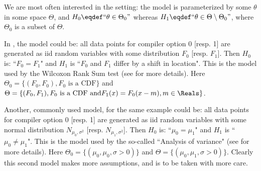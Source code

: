 We are most often interested in the  setting:
the model is parameterized by some $\theta$ in some space
$\Theta$, and  $H_0 \eqdef ``\theta \in \Theta_0 "$ whereas
$H_1 \eqdef ``\theta \in \Theta \setminus \Theta_0 "$, where
$\Theta_0$ is a subset of $\Theta$.

In , the model could be: all data points for
compiler option 0 [resp. 1] are generated as iid random
variables with some distribution $F_0$ [resp. $F_1$]. Then
$H_0$ is: ``$F_0=F_1$" and $H_1$ is ``$F_0$ and $F_1$ differ by
a shift in location". This is the model used by the Wilcoxon
Rank Sum test (see  for more details). Here
 $\Theta_0=\{(F_0, F_0), F_0 \mbox{ is a CDF}\}$ and
$\Theta=\{(F_0, F_1), F_0 \mbox{ is a CDF and} F_1(x)=F_0(x-m),
m\in \Reals\}$.

Another, commonly used model, for the same example could be:
all data points for compiler option 0 [resp. 1] are generated
as iid random variables with some normal distribution
$N_{\mu_0,\sigma^2}$ [resp. $N_{\mu_1,\sigma^2}$]. Then $H_0$
is: ``$\mu_0=\mu_1$" and $H_1$ is ``$\mu_0 \neq \mu_1$". This
is the model used by the so-called ``Analysis of variance" (see
 for more details). Here
$\Theta_0=\{(\mu_0,\mu_0, \sigma >0)\}$ and
$\Theta=\{(\mu_0,\mu_1, \sigma >0)\}$. Clearly this second
model makes more assumptions, and is to be taken with more
care.

